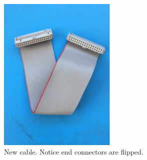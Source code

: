 \documentclass[11pt,a4paper]{article}
\begin{document}
\begin{figure} [htbp] 
		\centering
                \includegraphics[width=0.5\textwidth, angle = 270]{fig/NewCable.png}
                \caption{New cable. Notice end connectors are flipped.}
                \label{fig:NCable}
        \end{figure}
        
	
\end{document}
